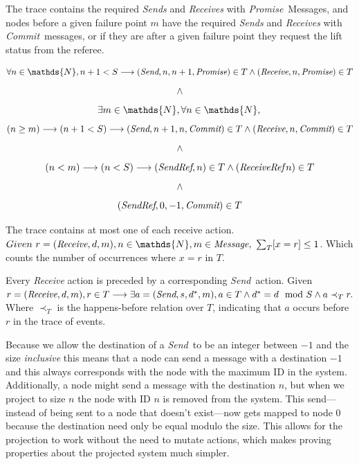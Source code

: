 \documentclass[runningheads]{llncs}
\newcommand{\send}{\emph{Send}}
\newcommand{\receive}{\emph{Receive}}
\newcommand{\sendref}{\emph{SendRef}}
\newcommand{\receiveref}{\emph{ReceiveRef}}
\newcommand{\promise}{\emph{Promise}}
\newcommand{\commit}{\emph{Commit}}
\newcommand{\happensbefore}{\prec_T}
\begin{document}
\begin{definition} The trace contains the required \emph{Sends} and \emph{Receives} with \promise\ Messages, and nodes before a given failure point $m$ have the required \emph{Sends} and \emph{Receives} with \commit\ messages, or if they are after a given failure point they request the lift status from the referee.

$$
   \forall n \in \mathds{N}, n + 1 < S \longrightarrow \\
   (\send, n, n+1, \promise) \in T \wedge (\receive, n, \promise) \in T\ \\
$$
$$ \wedge \\ $$
$$
   \exists m \in \mathds{N}, \forall n \in \mathds{N}, \\
$$
$$
   (n \ge m) \longrightarrow (n + 1 < S) \longrightarrow \\
   (\send, n+1, n, \commit) \in T \wedge (\receive, n, \commit) \in T\ \\
$$
$$ \wedge \\ $$
$$
   (n < m) \longrightarrow (n < S) \longrightarrow \\
   (\sendref, n) \in T \wedge (\receiveref\, n) \in T\ \\
$$
$$ \wedge \\ $$
$$
    (\sendref, 0, -1, \commit) \in T \\
$$
\end{definition}

\begin{definition}
The trace contains at most one of each receive action. 
$Given\ r = (\receive, d, m), n \in \mathds{N}, m \in \emph{Message},\ \sloppy{\sum_{T}[x=r]} \le 1$. Which counts the number of occurrences where $x=r$ in $T$. 
\end{definition}

\begin{definition}
Every \emph{Receive} action is preceded by a corresponding \send\ action. 
Given $r = (\receive, d, m), r \in T \longrightarrow \exists a = (\send, s, d^*, m), a \in T \wedge d^* = d \mod S \wedge a \happensbefore r.$ Where $\happensbefore$ is the happens-before relation over $T$, indicating that $a$ occurs before $r$ in the trace of events. 
\end{definition}

Because we allow the destination of a \send\ to be an integer between $-1$ and the size \emph{inclusive} this means that a node can send a message with a destination $-1$ and this always corresponds with the node with the maximum ID in the system. Additionally, a node might send a message with the destination $n$, but when we project to size $n$ the node with ID $n$ is removed from the system. This send---instead of being sent to a node that doesn't exist---now gets mapped to node $0$ because the destination need only be equal modulo the size. This allows for the projection to work without the need to mutate actions, which makes proving properties about the projected system much simpler.  
\end{document}
